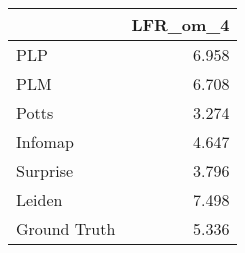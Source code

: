 \begin{tabular}{lr}
\toprule
{} & LFR_om_4 \\
\midrule
PLP          &    6.958 \\
PLM          &    6.708 \\
Potts        &    3.274 \\
Infomap      &    4.647 \\
Surprise     &    3.796 \\
Leiden       &    7.498 \\
Ground Truth &    5.336 \\
\bottomrule
\end{tabular}
